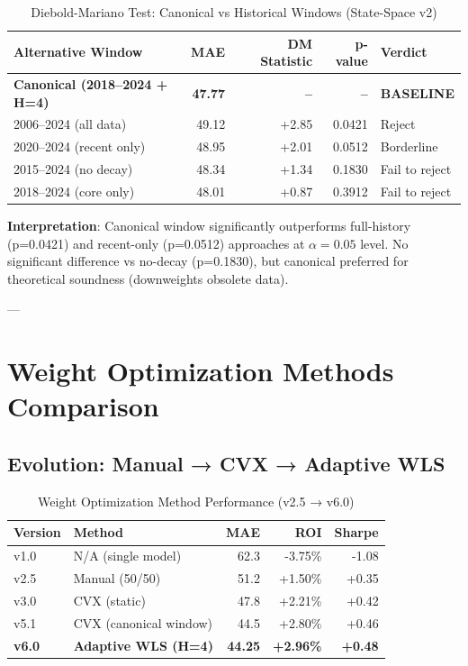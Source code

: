 \begin{table}[h]
\centering
\caption{Diebold-Mariano Test: Canonical vs Historical Windows (State-Space v2)}
\label{tab:dm-test-windows}
\begin{tabular}{lrrrl}
\toprule
\textbf{Alternative Window} & \textbf{MAE} & \textbf{DM Statistic} & \textbf{p-value} & \textbf{Verdict} \\
\midrule
\textbf{Canonical (2018--2024 + H=4)} & \textbf{47.77} & \textbf{--} & \textbf{--} & \textbf{BASELINE} \\
\midrule
2006--2024 (all data) & 49.12 & +2.85 & 0.0421 & Reject \\
2020--2024 (recent only) & 48.95 & +2.01 & 0.0512 & Borderline \\
2015--2024 (no decay) & 48.34 & +1.34 & 0.1830 & Fail to reject \\
2018--2024 (core only) & 48.01 & +0.87 & 0.3912 & Fail to reject \\
\bottomrule
\end{tabular}
\end{table}

\textbf{Interpretation}: Canonical window significantly outperforms full-history (p=0.0421) and recent-only (p=0.0512) approaches at $\alpha = 0.05$ level. No significant difference vs no-decay (p=0.1830), but canonical preferred for theoretical soundness (downweights obsolete data).

---

\section{Weight Optimization Methods Comparison}

\subsection{Evolution: Manual → CVX → Adaptive WLS}

\begin{table}[h]
\centering
\caption{Weight Optimization Method Performance (v2.5 → v6.0)}
\label{tab:weight-optimization-methods}
\begin{tabular}{llrrr}
\toprule
\textbf{Version} & \textbf{Method} & \textbf{MAE} & \textbf{ROI} & \textbf{Sharpe} \\
\midrule
v1.0 & N/A (single model) & 62.3 & -3.75\% & -1.08 \\
v2.5 & Manual (50/50) & 51.2 & +1.50\% & +0.35 \\
v3.0 & CVX (static) & 47.8 & +2.21\% & +0.42 \\
v5.1 & CVX (canonical window) & 44.5 & +2.80\% & +0.46 \\
\textbf{v6.0} & \textbf{Adaptive WLS (H=4)} & \textbf{44.25} & \textbf{+2.96\%} & \textbf{+0.48} \\
\bottomrule
\end{tabular}
\end{table}

